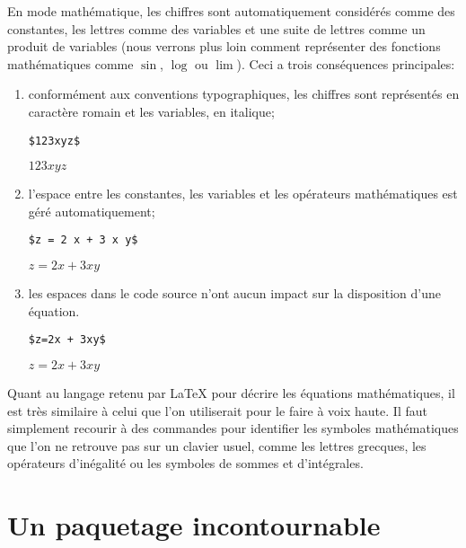 En mode mathématique, les chiffres sont automatiquement considérés
comme des constantes, les lettres comme des variables et une suite de
lettres comme un produit de variables (nous verrons plus loin comment
représenter des fonctions mathématiques comme $\sin$, $\log$ ou
$\lim$). Ceci a trois conséquences principales:
\begin{enumerate}
\item conformément aux conventions typographiques, les chiffres sont
  représentés en caractère \textrm{romain} et les variables, en
  italique;
  \begin{demo}
    \begin{texample}
\begin{lstlisting}
$123xyz$
\end{lstlisting}
      \producing
      $123xyz$
    \end{texample}
  \end{demo}
\item l'espace entre les constantes, les variables et les opérateurs
  mathématiques est géré automatiquement;
  \begin{demo}
    \begin{texample}
\begin{lstlisting}
$z = 2 x + 3 x y$
\end{lstlisting}
    \producing
    $z = 2 x + 3 x y$
    \end{texample}
  \end{demo}
\item les espaces dans le code source n'ont aucun impact sur la
  disposition d'une équation.
  \begin{demo}
    \begin{texample}
\begin{lstlisting}
$z=2x + 3xy$
\end{lstlisting}
    \producing
    $z=2x + 3xy$
    \end{texample}
  \end{demo}
\end{enumerate}

Quant au langage retenu par {\LaTeX} pour décrire les équations
mathématiques, il est très similaire à celui que l'on utiliserait pour
le faire à voix haute. Il faut simplement recourir à des commandes
pour identifier les symboles mathématiques que l'on ne retrouve pas
sur un clavier usuel, comme les lettres grecques, les opérateurs
d'inégalité ou les symboles de sommes et d'intégrales.


\section{Un paquetage incontournable}
\label{sec:math:amsmath}

